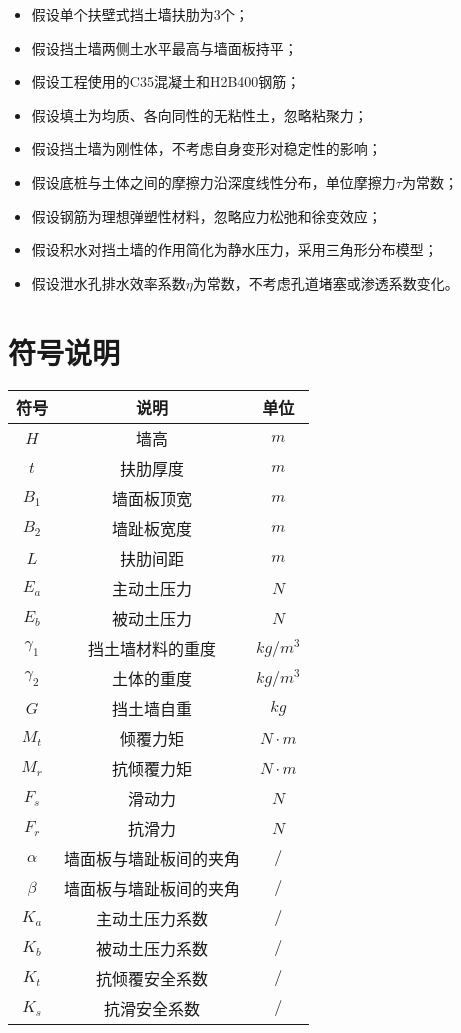 \documentclass[withoutpreface,bwprint]{cumcmthesis}
\begin{document}
\begin{itemize}[itemindent=2em]
\item 假设单个扶壁式挡土墙扶肋为3个；
\item 假设挡土墙两侧土水平最高与墙面板持平；
\item 假设工程使用的C35混凝土和H2B400钢筋；
\item 假设填土为均质、各向同性的无粘性土，忽略粘聚力；
\item 假设挡土墙为刚性体，不考虑自身变形对稳定性的影响；
\item 假设底桩与土体之间的摩擦力沿深度线性分布，单位摩擦力\(\tau\)为常数；
\item 假设钢筋为理想弹塑性材料，忽略应力松弛和徐变效应；
\item 假设积水对挡土墙的作用简化为静水压力，采用三角形分布模型；
\item 假设泄水孔排水效率系数\(\eta\)为常数，不考虑孔道堵塞或渗透系数变化。
\end{itemize}



\section{符号说明}
\begin{table}[H]
\centering
\begin{tabularx}{\textwidth}{CCC}  %
\toprule
符号    & 说明    & 单位 \\
\midrule
$H     $& 墙高 & $m$ \\
$t     $& 扶肋厚度 & $m$ \\
$B_1   $& 墙面板顶宽 & $m$ \\
$B_2   $& 墙趾板宽度 & $m$ \\
$L     $& 扶肋间距 & $m$ \\
$E_a   $& 主动土压力 & $N$ \\
$E_b   $& 被动土压力 & $N$ \\
$\gamma_1     $& 挡土墙材料的重度 & $kg/m^3$ \\
$\gamma_2     $& 土体的重度 & $kg/m^3$ \\
$G     $& 挡土墙自重 & $kg$ \\
$M_t     $& 倾覆力矩 & $N\cdot m$ \\
$M_r     $& 抗倾覆力矩 & $N\cdot m$ \\
$F_s     $& 滑动力 & $N$ \\
$F_r     $& 抗滑力 & $N$ \\
$\alpha$& 墙面板与墙趾板间的夹角 & $/$ \\
$\beta $& 墙面板与墙趾板间的夹角 & $/$ \\
$K_a     $& 主动土压力系数 & $/$ \\
$K_b     $& 被动土压力系数 & $/$ \\
$K_t     $& 抗倾覆安全系数 & $/$ \\
$K_s     $& 抗滑安全系数 & $/$ \\
\bottomrule
\end{tabularx}
\label{tab:符号说明}
\end{table}
\end{document}
